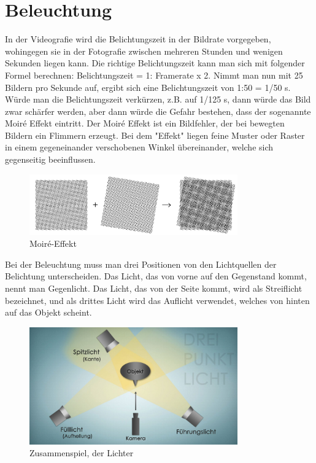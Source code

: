 \section{Beleuchtung}
In der Videografie wird die Belichtungszeit in der Bildrate vorgegeben, wohingegen sie in der Fotografie zwischen mehreren Stunden und wenigen Sekunden liegen kann.
Die richtige Belichtungszeit kann man sich mit folgender Formel berechnen: Belichtungszeit = 1: Framerate x 2. Nimmt man nun mit 25 Bildern pro Sekunde auf, ergibt sich eine Belichtungszeit von 1:50 = 1/50 s. Würde man die Belichtungszeit verkürzen, z.B. auf 1/125 s, dann würde das Bild zwar schärfer werden, aber dann würde die Gefahr bestehen, dass der sogenannte Moir\'{e} Effekt eintritt. Der Moir\'{e} Effekt ist ein Bildfehler, der bei bewegten Bildern ein Flimmern erzeugt. Bei dem "Effekt" liegen feine Muster oder Raster in einem gegeneinander verschobenen Winkel übereinander, welche sich gegenseitig beeinflussen. 
\begin{figure}[h]
	\centering
	\includegraphics[width=0.8\textwidth]{abb2} 
	\caption{Moir\'{e}-Effekt}
\end{figure}

Bei der Beleuchtung muss man drei Positionen von den Lichtquellen der Belichtung unterscheiden. Das Licht, das von vorne auf den Gegenstand kommt, nennt man Gegenlicht. Das Licht, das von der Seite kommt, wird als Streiflicht bezeichnet, und als drittes Licht wird das Auflicht verwendet, welches von hinten auf das Objekt scheint.
\begin{figure}[h]
	\centering
	\includegraphics[width=0.8\textwidth]{abb3} 
	\caption{Zusammenspiel, der Lichter}
\end{figure}

